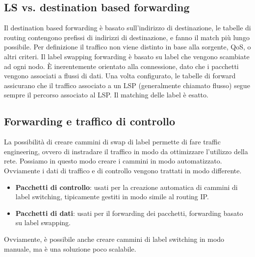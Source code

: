 \subsection{LS vs. destination based forwarding}
Il destination based forwarding è basato sull'indirizzo di destinazione, le tabelle di routing contengono prefissi di indirizzi di destinazione, e fanno il match più lungo possibile.
Per definizione il traffico non viene distinto in base alla sorgente, QoS, o altri criteri.
Il label swapping forwarding è basato su label che vengono scambiate ad ogni nodo. 
È inerentemente orientato alla connessione, dato che i pacchetti vengono associati a flussi di dati.
Una volta configurato, le tabelle di forward assicurano che il traffico associato a un LSP (generalmente chiamato flusso) segue sempre il percorso associato al LSP.
Il matching delle label è esatto.
\subsection{Forwarding e traffico di controllo}
La possibilità di creare cammini di swap di label permette di fare traffic engineering, ovvero di instradare il traffico in modo da ottimizzare l'utilizzo della rete.
Possiamo in questo modo creare i cammini in modo automatizzato. Ovviamente i dati di traffico e di controllo vengono trattati in modo differente.
\begin{itemize}
	\item \textbf{Pacchetti di controllo}: usati per la creazione automatica di cammini di label switching, tipicamente gestiti in modo simile al routing IP.
	\item \textbf{Pacchetti di dati}: usati per il forwarding dei pacchetti, forwarding basato su label swapping. 
\end{itemize}
Ovviamente, è possibile anche creare cammini di label switching in modo manuale, ma è una soluzione poco scalabile.
